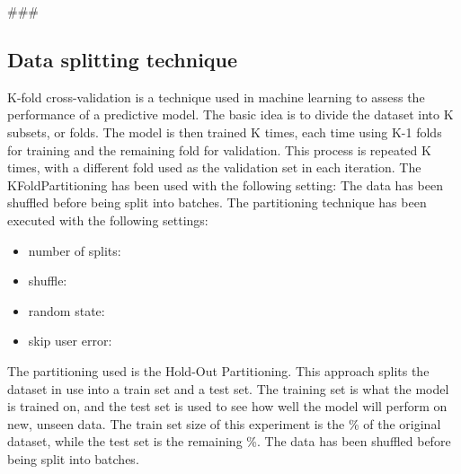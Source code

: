 \usepackage{comment}

###

\subsection{Data splitting technique}\label{subsec:partitioning}
K-fold cross-validation is a technique used in machine learning to assess the performance of a predictive model.
The basic idea is to divide the dataset into K subsets, or folds.
The model is then trained K times, each time using K-1 folds for training and the remaining fold for validation.
This process is repeated K times, with a different fold used as the validation set in each iteration.
\hfill\break
The KFoldPartitioning has been used with the following setting:
\hfill\break
{}
The data has been shuffled before being split into batches.
The partitioning technique has been executed with the following settings:
\begin{itemize}
    \item number of splits: 
    \item shuffle: 
    \item random state: 
    \item skip user error: 
\end{itemize}
\hfill\break

The partitioning used is the Hold-Out Partitioning.
This approach splits the dataset in use into a train set and a test set.
The training set is what the model is trained on, and the test set is used to see how
well the model will perform on new, unseen data.
\hfill\break
The train set size of this experiment is the \%
of the original dataset, while the test set is the remaining \%.
\hfill\break
{}
The data has been shuffled before being split into batches.
\hfill\break

